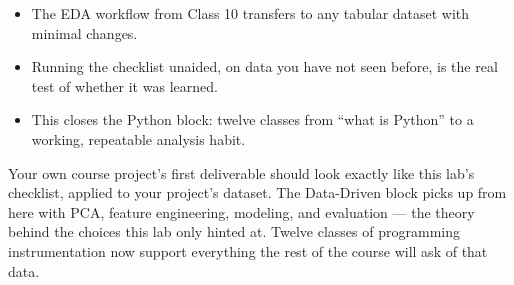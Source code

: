 \classclosingframe
{\begin{itemize}
\item The EDA workflow from Class 10 transfers to any tabular dataset with minimal changes.
\item Running the checklist unaided, on data you have not seen before, is the real test of whether it was learned.
\item This closes the Python block: twelve classes from ``what is Python'' to a working, repeatable analysis habit.
\end{itemize}}
{Your own course project's first deliverable should look exactly like this lab's checklist, applied to your project's dataset.}
{The Data-Driven block picks up from here with PCA, feature engineering, modeling, and evaluation --- the theory behind the choices this lab only hinted at.}
{Twelve classes of programming instrumentation now support everything the rest of the course will ask of that data.}


